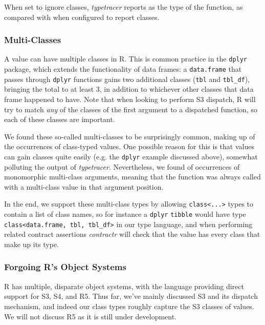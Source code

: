 \documentclass[acmsmall,review,anonymous]{acmart}\settopmatter{printfolios=true,printccs=false,printacmref=false}
\newcommand{\code}[1]{{\lstinline[style=Rin]!#1!}\xspace}
\newcommand{\contractr}{\emph{contractr}\xspace} %
\newcommand{\typetracer}{\emph{typetracer}\xspace} %
\begin{document}
When set to ignore classes, \typetracer reports  as the type of the function, as compared with  when configured to report classes.

%
%
\subsubsection{Multi-Classes}

A value can have multiple classes in R.
This is common practice in the \code{dplyr} package, which extends the functionality of data frames: a \code{data.frame} that passes through \code{dplyr} functions gains two additional classes (\code{tbl} and \code{tbl_df}), bringing the total to at least 3, in addition to whichever other classes that data frame happened to have.
Note that when looking to perform S3 dispatch, R will try to match {\it any} of the classes of the first argument to a dispatched function, so each of these classes are important.

We found these so-called multi-classes to be surprisingly common, making up  of the occurrences of class-typed values.
One possible reason for this is that values can gain classes quite easily (e.g. the \code{dplyr} example discussed above), somewhat polluting the output of \typetracer.
Nevertheless, we found  of occurrences of monomorphic multi-class arguments, meaning that the function was always called with a multi-class value in that argument position.

In the end, we support these multi-class types by allowing \code{class<...>} types to contain a list of class names, so for instance a \code{dplyr} \code{tibble} would have type \code{class<data.frame, tbl, tbl_df>} in our type language, and when performing related contract assertions \contractr will check that the value has every class that make up its type.

%
%
\subsubsection{Forgoing R's Object Systems}

R has multiple, disparate object systems, with the language providing direct
support for S3, S4, and R5.  Thus far, we've mainly discussed S3 and its
dispatch mechanism, and indeed our class types roughly capture the S3
classes of values.  We will not discuss R5 as it is still under
development.
\end{document}
